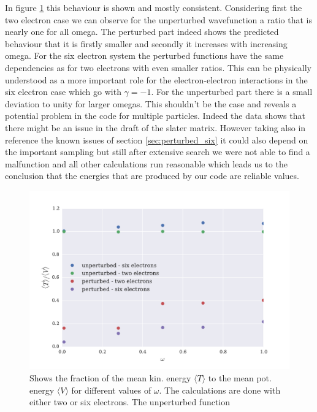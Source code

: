 In figure \ref{fig:virialtheorem} this behaviour is shown and mostly consistent. Considering first the two electron case we can observe for the unperturbed wavefunction a ratio that is nearly one for all omega. The perturbed part indeed shows the predicted behaviour that it is firstly smaller and secondly it increases with increasing omega. For the six electron system the perturbed functions have the same dependencies as for two electrons with even smaller ratios. This can be physically understood as a more important role for the electron-electron interactions in the six electron case which go with $\gamma = -1$. For the unperturbed part there is a small deviation to unity for larger omegas. This shouldn't be the case and reveals a potential problem in the code for multiple particles. Indeed the data shows that there might be an issue in the draft of the slater matrix. However taking also in reference the known issues of section \ref{sec:perturbed_six} it could also depend on the important sampling but still after extensive search we were not able to find a malfunction and all other calculations run reasonable which leads us to the conclusion that the energies that are produced by our code are reliable values.  
\begin{figure}[htbp]
    \centering
    \includegraphics[scale=0.7]{virialtheorem}
    \caption{Shows the fraction of the mean kin. energy $\langle T \rangle$ to the mean pot. energy $\langle V \rangle$ for different values of $\omega$. The calculations are done with either two or six electrons. The unperturbed function}
    \label{fig:virialtheorem}
\end{figure}

